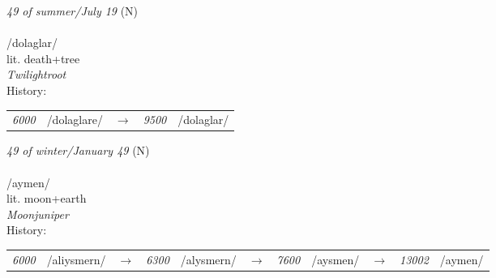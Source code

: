 \vspace{15pt}
\begin{nopagebreak}
 \textit{49 of summer/July 19} (N)\\
\\
\noindent /dol{\textprimstress}aglar/\\
\noindent lit. death+tree\\
\noindent \textit{Twilightroot}\\


\noindent History:

\vspace{-0pt}
\hspace{40pt}
\begin{tabular}{ccc}
\textit{6000} & /dolaglare/&$\rightarrow$ & \textit{9500} & /dolaglar/& \\
\end{tabular}

\vspace{20pt}\hline

\end{nopagebreak}
\filbreak



\vspace{15pt}
\begin{nopagebreak}
 \textit{49 of winter/January 49} (N)\\
\\
\noindent /{\textprimstress}aymen/\\
\noindent lit. moon+earth\\
\noindent \textit{Moonjuniper}\\


\noindent History:

\vspace{-0pt}
\hspace{40pt}
\begin{tabular}{ccc}
\textit{6000} & /aliysmern/&$\rightarrow$ & \textit{6300} & /alysmern/&$\rightarrow$ & \textit{7600} & /aysmen/&$\rightarrow$ & \textit{13002} & /aymen/& \\
\end{tabular}

\vspace{20pt}\hline

\end{nopagebreak}
\filbreak




